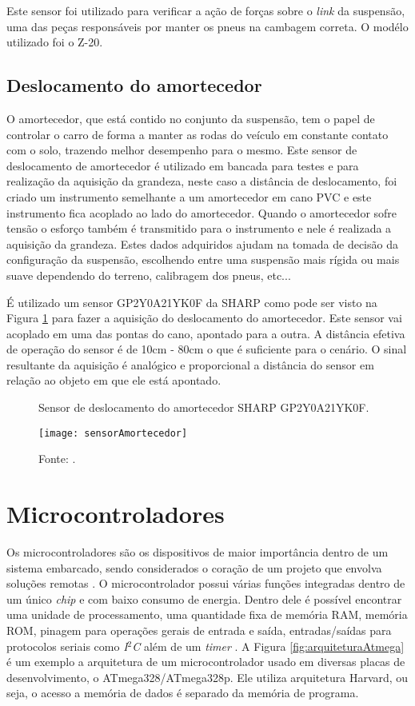Este sensor foi utilizado para verificar a ação de forças sobre o \textit{link} da suspensão, uma das peças responsáveis por manter os pneus na cambagem correta. O modélo utilizado foi o Z-20.   

\subsection{Deslocamento do amortecedor}

O amortecedor, que está contido no conjunto da suspensão, tem o papel de controlar o carro de forma a manter as rodas do veículo em constante contato com o solo, trazendo melhor desempenho para o mesmo. Este sensor de deslocamento de amortecedor é utilizado em bancada para testes e para realização da aquisição da grandeza, neste caso a distância de deslocamento, foi criado um instrumento semelhante a um amortecedor em cano PVC e este instrumento fica acoplado ao lado do amortecedor. Quando o amortecedor sofre tensão o esforço também é transmitido para o instrumento e nele é realizada a aquisição da grandeza. Estes dados adquiridos ajudam na tomada de decisão da configuração da suspensão, escolhendo entre uma suspensão mais rígida ou mais suave dependendo do terreno, calibragem dos pneus, etc...     

É utilizado um sensor GP2Y0A21YK0F da SHARP como pode ser visto na Figura \ref{fig:sensorAmortecedor} para fazer a aquisição do deslocamento do amortecedor. Este sensor vai acoplado em uma das pontas do cano, apontado para a outra. A distância efetiva de operação do sensor é de 10cm - 80cm \cite{SHARP} o que é suficiente para o cenário. O sinal resultante da aquisição é analógico e proporcional a distância do sensor em relação ao objeto em que ele está apontado. 


\begin{figure}[!htb]
	\centering
		\caption{Sensor de deslocamento do amortecedor SHARP GP2Y0A21YK0F.}
		\texttt{[image: sensorAmortecedor]} 
		\caption*{Fonte: \cite{SHARP}.}
		\label{fig:sensorAmortecedor}
\end{figure} 


\section{Microcontroladores}
\label{sec:microcontroladores}

Os microcontroladores são os dispositivos de maior importância dentro de um sistema embarcado, sendo considerados o coração de um projeto que envolva soluções remotas \cite{aSurveyTo2010}. O microcontrolador possui várias funções integradas dentro de um único \textit{chip} e com baixo consumo de energia. Dentro dele é possível encontrar uma unidade de processamento, uma quantidade fixa de memória RAM, memória ROM, pinagem para operações gerais de entrada e saída, entradas/saídas para protocolos seriais como \textit{I$^2$C} além de um \textit{timer} \cite{mazidi2008pic}. A Figura \ref{fig:arquiteturaAtmega} é um exemplo a arquitetura de um microcontrolador usado em diversas placas de desenvolvimento, o ATmega328/ATmega328p. Ele utiliza arquitetura Harvard, ou seja, o acesso a memória de dados é separado da memória de programa.        


